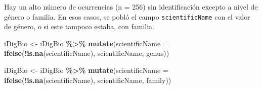 \documentclass[sn-apa,pdflatex]{sn-jnl}
\newenvironment{Shaded}{\begin{snugshade}}{\end{snugshade}}
\newcommand{\AttributeTok}[1]{\textcolor[rgb]{0.13,0.29,0.53}{#1}}
\newcommand{\CommentTok}[1]{\textcolor[rgb]{0.56,0.35,0.01}{\textit{#1}}}
\newcommand{\FunctionTok}[1]{\textcolor[rgb]{0.13,0.29,0.53}{\textbf{#1}}}
\newcommand{\NormalTok}[1]{#1}
\newcommand{\OtherTok}[1]{\textcolor[rgb]{0.56,0.35,0.01}{#1}}
\newcommand{\SpecialCharTok}[1]{\textcolor[rgb]{0.81,0.36,0.00}{\textbf{#1}}}
\newcommand{\StringTok}[1]{\textcolor[rgb]{0.31,0.60,0.02}{#1}}
\begin{document}
\begin{Shaded}
\end{Shaded}

Hay un alto número de ocurrencias (n = 256) sin identificación excepto a
nivel de género o familia. En esos casos, se pobló el campo
\texttt{scientificName} con el valor de género, o si este tampoco
estaba, con familia.

\begin{Shaded}
\begin{Highlighting}[]
\NormalTok{iDigBio }\OtherTok{\textless{}{-}}\NormalTok{ iDigBio }\SpecialCharTok{\%\textgreater{}\%}
    \FunctionTok{mutate}\NormalTok{(}\AttributeTok{scientificName =} \FunctionTok{ifelse}\NormalTok{(}\SpecialCharTok{!}\FunctionTok{is.na}\NormalTok{(scientificName), scientificName,}
\NormalTok{        genus))}

\NormalTok{iDigBio }\OtherTok{\textless{}{-}}\NormalTok{ iDigBio }\SpecialCharTok{\%\textgreater{}\%}
    \FunctionTok{mutate}\NormalTok{(}\AttributeTok{scientificName =} \FunctionTok{ifelse}\NormalTok{(}\SpecialCharTok{!}\FunctionTok{is.na}\NormalTok{(scientificName), scientificName,}
\NormalTok{        family))}
\end{Highlighting}
\end{Shaded}
\end{document}
